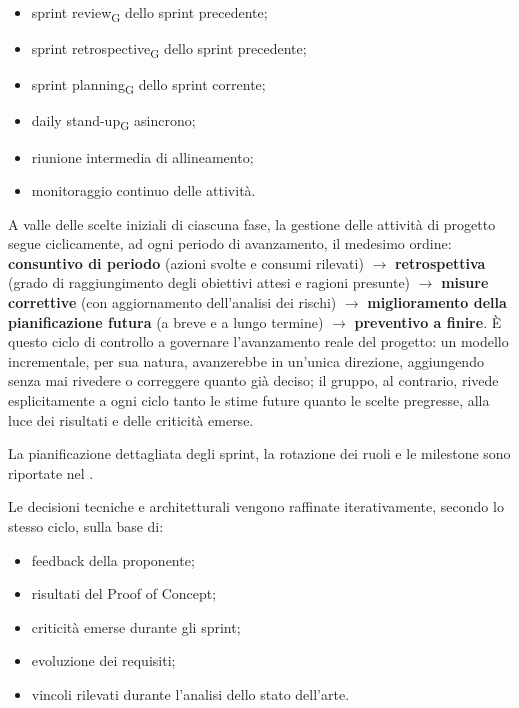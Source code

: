 \begin{itemize}
    \item sprint review\textsubscript{G} dello sprint precedente;
    \item sprint retrospective\textsubscript{G} dello sprint precedente;
    \item sprint planning\textsubscript{G} dello sprint corrente;
    \item daily stand-up\textsubscript{G} asincrono;
    \item riunione intermedia di allineamento;
    \item monitoraggio continuo delle attività.
\end{itemize}

A valle delle scelte iniziali di ciascuna fase, la gestione delle attività di
progetto segue ciclicamente, ad ogni periodo di avanzamento, il medesimo
ordine: \textbf{consuntivo di periodo} (azioni svolte e consumi rilevati)
$\rightarrow$ \textbf{retrospettiva} (grado di raggiungimento degli obiettivi
attesi e ragioni presunte) $\rightarrow$ \textbf{misure correttive} (con
aggiornamento dell'analisi dei rischi) $\rightarrow$ \textbf{miglioramento
della pianificazione futura} (a breve e a lungo termine) $\rightarrow$
\textbf{preventivo a finire}. È questo ciclo di controllo a governare l'avanzamento reale
del progetto: un modello incrementale, per sua natura, avanzerebbe in
un'unica direzione, aggiungendo senza mai rivedere o correggere quanto già
deciso; il gruppo, al contrario, rivede esplicitamente a ogni ciclo tanto le
stime future quanto le scelte pregresse, alla luce dei risultati e delle
criticità emerse.

La pianificazione dettagliata degli sprint, la rotazione dei ruoli e le
milestone sono riportate nel .

Le decisioni tecniche e architetturali vengono raffinate iterativamente, secondo lo stesso ciclo, sulla base di:

\begin{itemize}
    \item feedback della proponente;
    \item risultati del Proof of Concept;
    \item criticità emerse durante gli sprint;
    \item evoluzione dei requisiti;
    \item vincoli rilevati durante l'analisi dello stato dell'arte.
\end{itemize}

